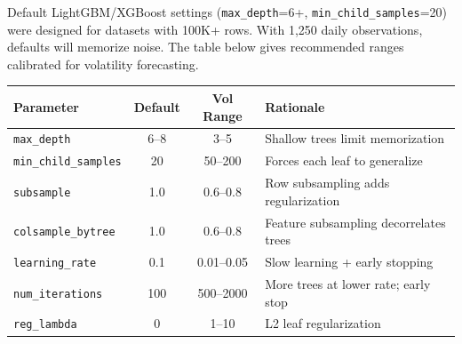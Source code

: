 \begin{warning}
Default LightGBM/XGBoost settings (\texttt{max\_depth}=6+,
\texttt{min\_child\_samples}=20) were designed for datasets with 100K+ rows.
With 1,250 daily observations, defaults will memorize noise.  The table below
gives recommended ranges calibrated for volatility forecasting.
\end{warning}

\begin{center}
\renewcommand{\arraystretch}{1.25}
\begin{tabular}{@{}lccl@{}}
\toprule
\textbf{Parameter} & \textbf{Default} & \textbf{Vol Range} & \textbf{Rationale} \\
\midrule
\texttt{max\_depth}        & 6--8  & 3--5     & Shallow trees limit memorization \\
\texttt{min\_child\_samples}& 20   & 50--200  & Forces each leaf to generalize \\
\texttt{subsample}         & 1.0   & 0.6--0.8 & Row subsampling adds regularization \\
\texttt{colsample\_bytree} & 1.0   & 0.6--0.8 & Feature subsampling decorrelates trees \\
\texttt{learning\_rate}    & 0.1   & 0.01--0.05 & Slow learning + early stopping \\
\texttt{num\_iterations}   & 100   & 500--2000 & More trees at lower rate; early stop \\
\texttt{reg\_lambda}       & 0     & 1--10    & L2 leaf regularization \\
\bottomrule
\end{tabular}
\end{center}

